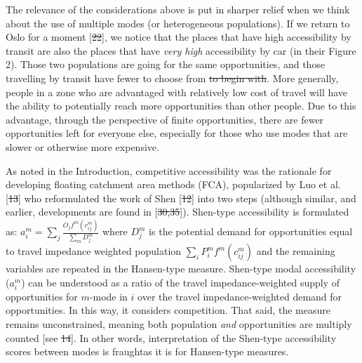 \documentclass[10pt,letterpaper]{article}
\providecommand{\DIFaddtex}[1]{{\protect\color{blue}\uwave{#1}}} %
\providecommand{\DIFdeltex}[1]{{\protect\color{red}\sout{#1}}}                      %
\providecommand{\DIFaddbegin}{} %
\providecommand{\DIFaddend}{} %
\providecommand{\DIFdelbegin}{} %
\providecommand{\DIFdelend}{} %
\providecommand{\DIFadd}[1]{\texorpdfstring{\DIFaddtex{#1}}{#1}} %
\providecommand{\DIFdel}[1]{\texorpdfstring{\DIFdeltex{#1}}{}} %
\newcommand{\DIFscaledelfig}{0.5}
\newlength{\DIFdelgraphicswidth} %
\newlength{\DIFdelgraphicsheight} %
\newcommand{\DIFaddincludegraphics}[2][]{{\color{blue}\fbox{\DIFOincludegraphics[#1]{#2}}}} %
\newcommand{\DIFdelincludegraphics}[2][]{%
\sbox{\DIFdelgraphicsbox}{\DIFOincludegraphics[#1]{#2}}%
\settoboxwidth{\DIFdelgraphicswidth}{\DIFdelgraphicsbox} %
\settoboxtotalheight{\DIFdelgraphicsheight}{\DIFdelgraphicsbox} %
\scalebox{\DIFscaledelfig}{%
\parbox[b]{\DIFdelgraphicswidth}{\usebox{\DIFdelgraphicsbox}\\[-\baselineskip] \rule{\DIFdelgraphicswidth}{0em}}\llap{\resizebox{\DIFdelgraphicswidth}{\DIFdelgraphicsheight}{%
\setlength{\unitlength}{\DIFdelgraphicswidth}%
\begin{picture}(1,1)%
\thicklines\linethickness{2pt} %
{\color[rgb]{1,0,0}\put(0,0){\framebox(1,1){}}}%
{\color[rgb]{1,0,0}\put(0,0){\line( 1,1){1}}}%
{\color[rgb]{1,0,0}\put(0,1){\line(1,-1){1}}}%
\end{picture}%
}\hspace*{3pt}}} %
} %
\DeclareRobustCommand{\DIFaddbegin}{\DIFOaddbegin \let\includegraphics\DIFaddincludegraphics} %
\DeclareRobustCommand{\DIFaddend}{\DIFOaddend \let\includegraphics\DIFOincludegraphics} %
\DeclareRobustCommand{\DIFdelbegin}{\DIFOdelbegin \let\includegraphics\DIFdelincludegraphics} %
\DeclareRobustCommand{\DIFdelend}{\DIFOaddend \let\includegraphics\DIFOincludegraphics} %
\begin{document}
The relevance of the considerations above is put in sharper relief when
we think about the use of multiple modes (or heterogeneous populations).
If we return to Oslo for a moment {[}\DIFdelbegin \DIFdel{22}\DIFdelend \DIFaddbegin \DIFadd{35}\DIFaddend {]}, we notice that the places
that have high accessibility by transit are also the places that have
\emph{very high} accessibility by car (in their Figure 2). Those two
populations are going for the same opportunities, and those travelling
by transit have fewer to choose from \DIFdelbegin \DIFdel{to begin with}\DIFdelend \DIFaddbegin \DIFadd{the start}\DIFaddend . More generally, people
in a zone who are advantaged with relatively low cost of travel will
have the ability to potentially reach more opportunities than other
people. Due to this advantage, through the perspective of finite
opportunities, there are fewer opportunities left for everyone else,
especially for those who use modes that are slower or otherwise more
expensive.

As noted in the Introduction, competitive accessibility was the
rationale for developing floating catchment area methods (FCA),
popularized by Luo et al. {[}\DIFdelbegin \DIFdel{13}\DIFdelend \DIFaddbegin \DIFadd{28}\DIFaddend {]} who reformulated the work of Shen
{[}\DIFdelbegin \DIFdel{12}\DIFdelend \DIFaddbegin \DIFadd{24}\DIFaddend {]} into two steps (although similar, and earlier, developments are
found in {[}\DIFdelbegin \DIFdel{30,35}\DIFdelend \DIFaddbegin \DIFadd{21,23}\DIFaddend {]}). Shen-type accessibility is formulated as:
\(a_i^m = \sum_j \frac{O_jf^m(c_{ij}^m)}{\sum_m D_j^m}\) where \(D_j^m\)
is the potential demand for opportunities equal to travel impedance
weighted population \(\sum_i P_i^m f^m(c_{ij}^m)\) and the remaining
variables are repeated in the Hansen-type measure. Shen-type modal
accessibility (\(a_i^m\)) can be understood as a ratio of the travel
impedance-weighted supply of opportunities for \(m\)-mode in \(i\) over
the travel impedance-weighted demand for opportunities. In this way, it
considers competition. That said, the measure remains unconstrained,
meaning both population \emph{and} opportunities are multiply counted
{[}see \DIFdelbegin \DIFdel{14}\DIFdelend \DIFaddbegin \DIFadd{12}\DIFaddend {]}. In other words, interpretation of the Shen-type
accessibility scores between modes is fraught\DIFaddbegin \DIFadd{, }\DIFaddend as it is for Hansen-type
measures.
\end{document}
